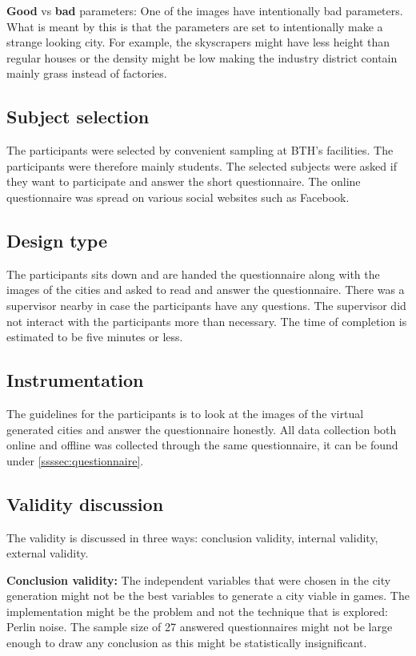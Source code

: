 	\textbf{Good} vs \textbf{bad} parameters: One of the images have intentionally bad parameters. What is meant by this is that the parameters are set to intentionally make a strange looking city. For example, the skyscrapers might have less height than regular houses or the density might be low making the industry district contain mainly grass instead of factories.
			
	\subsection{Subject selection}
	The participants were selected by convenient sampling at BTH's facilities. The participants were therefore mainly students. The selected subjects were asked if they want to participate and answer the short questionnaire. The online questionnaire was spread on various social websites such as Facebook.
			
	\subsection{Design type}
	The participants sits down and are handed the questionnaire along with the images of the cities and asked to read and answer the questionnaire. There was a supervisor nearby in case the participants have any questions. The supervisor did not interact with the participants more than necessary.  The time of completion is estimated to be five minutes or less.
			
	\subsection{Instrumentation}
	The guidelines for the participants is to look at the images of the virtual generated cities and answer the questionnaire honestly. All data collection both online and offline was collected through the same questionnaire, it can be found under \ref{ssssec:questionnaire}.
			
	\subsection{Validity discussion} 
	The validity is discussed in three ways: conclusion validity, internal validity, external validity\cite{ExperimentationInSoftware}.
	
	\par
	\textbf{Conclusion validity:} The independent variables that were chosen in the city generation might not be the best variables to generate a city viable in games. The implementation might be the problem and not the technique that is explored: Perlin noise. The sample size of 27 answered questionnaires might not be large enough to draw any conclusion as this might be statistically insignificant.
	
